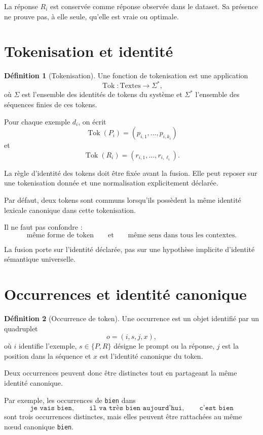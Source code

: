 \documentclass[11pt,a4paper]{report}
\theoremstyle{definition}
\newtheorem{definition}{Définition}[chapter]
\theoremstyle{plain}
\theoremstyle{remark}
\begin{document}
La réponse \(R_i\) est conservée comme réponse observée dans le
dataset. Sa présence ne prouve pas, à elle seule, qu'elle est
vraie ou optimale.

\section{Tokenisation et identité}

\begin{definition}[Tokenisation]
Une fonction de tokenisation est une application
\[
\operatorname{Tok}:\text{Textes}\longrightarrow\Sigma^*,
\]
où \(\Sigma\) est l'ensemble des identités de tokens du système
et \(\Sigma^*\) l'ensemble des séquences finies de ces tokens.

Pour chaque exemple \(d_i\), on écrit
\[
\operatorname{Tok}(P_i)=(p_{i,1},\ldots,p_{i,k_i})
\]
et
\[
\operatorname{Tok}(R_i)=(r_{i,1},\ldots,r_{i,\ell_i}).
\]
\end{definition}

La règle d'identité des tokens doit être fixée avant la fusion.
Elle peut reposer sur une tokenisation donnée et une normalisation
explicitement déclarée.

Par défaut, deux tokens sont communs lorsqu'ils possèdent la
même identité lexicale canonique dans cette tokenisation.

Il ne faut pas confondre :
\[
\text{même forme de token}
\qquad\text{et}\qquad
\text{même sens dans tous les contextes}.
\]

La fusion porte sur l'identité déclarée, pas sur une hypothèse
implicite d'identité sémantique universelle.

\section{Occurrences et identité canonique}

\begin{definition}[Occurrence de token]
Une occurrence est un objet identifié par un quadruplet
\[
o=(i,s,j,x),
\]
où \(i\) identifie l'exemple, \(s\in\{P,R\}\) désigne le prompt
ou la réponse, \(j\) est la position dans la séquence et \(x\)
est l'identité canonique du token.

Deux occurrences peuvent donc être distinctes tout en partageant
la même identité canonique.
\end{definition}

Par exemple, les occurrences de \texttt{bien} dans
\[
\texttt{je vais bien},
\qquad
\texttt{il va très bien aujourd'hui},
\qquad
\texttt{c'est bien}
\]
sont trois occurrences distinctes, mais elles peuvent être
rattachées au même nœud canonique \texttt{bien}.
\end{document}
